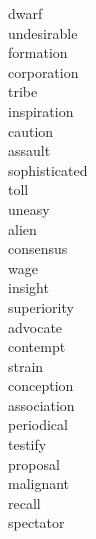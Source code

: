 \documentclass[a4paper, 10pt]{ctexart}
\begin{document}
\begin{multicols*}{2}
\begin{description}
\item[dwarf]

\item[undesirable]

\item[formation]

\item[corporation]

\item[tribe]

\item[inspiration]

\item[caution]

\item[assault]

\item[sophisticated]

\item[toll]

\item[uneasy]

\item[alien]

\item[consensus]

\item[wage]

\item[insight]

\item[superiority]

\item[advocate]

\item[contempt]

\item[strain]

\item[conception]

\item[association]

\item[periodical]

\item[testify]

\item[proposal]

\item[malignant]

\item[recall]

\item[spectator]


\end{description}
\end{multicols*}
\end{document}
